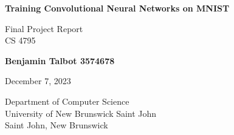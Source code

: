 \begin{titlepage}
    \begin{center}
        \vspace*{1cm}

        \LARGE
        \textbf{Training Convolutional Neural Networks on MNIST}

        \vspace{0.5cm}
        \Large
        Final Project Report\\
        CS 4795

        \vspace{2cm}

        \textbf{Benjamin Talbot 3574678}
        
        \vspace{0.5cm}
        December 7, 2023
        
        \vspace{9cm}

        \large
        Department of Computer Science\\
        University of New Brunswick Saint John\\
        Saint John, New Brunswick\\
    \end{center}
\end{titlepage}